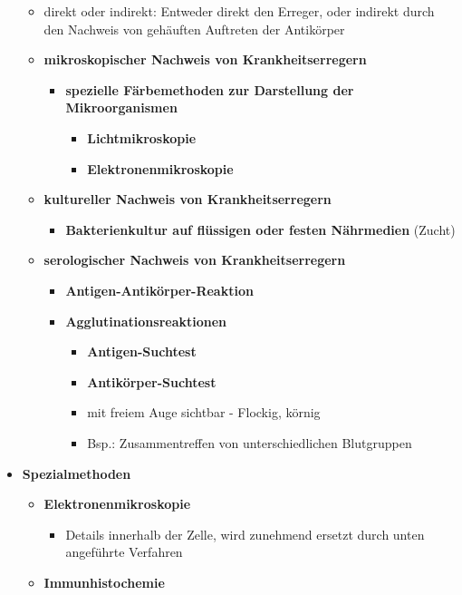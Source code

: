 \begin{itemize}
\begin{itemize}
				\item direkt oder indirekt: Entweder direkt den Erreger, oder indirekt durch den Nachweis von gehäuften Auftreten der Antikörper
				\item \textbf{mikroskopischer Nachweis von Krankheitserregern}
					\begin{itemize}
						\item \textbf{spezielle Färbemethoden zur Darstellung der Mikroorganismen}
							\begin{itemize}
								\item \textbf{Lichtmikroskopie}
								\item \textbf{Elektronenmikroskopie}
							\end{itemize}
					\end{itemize}
				\item \textbf{kultureller Nachweis von Krankheitserregern}
					\begin{itemize}
						\item \textbf{Bakterienkultur auf flüssigen oder festen Nährmedien} (Zucht)
					\end{itemize}
				\item \textbf{serologischer Nachweis von Krankheitserregern}
					\begin{itemize}
						\item \textbf{Antigen-Antikörper-Reaktion}
						\item \textbf{Agglutinationsreaktionen}
							\begin{itemize}
								\item \textbf{Antigen-Suchtest}
								\item \textbf{Antikörper-Suchtest}
								\item mit freiem Auge sichtbar - Flockig, körnig
								\item Bsp.: Zusammentreffen von unterschiedlichen Blutgruppen
							\end{itemize}
					\end{itemize}
			\end{itemize}
		\item \textbf{Spezialmethoden}
			\begin{itemize}
				\item \textbf{Elektronenmikroskopie}
					\begin{itemize}
						\item Details innerhalb der Zelle, wird zunehmend ersetzt durch unten angeführte Verfahren
					\end{itemize}
				\item \textbf{Immunhistochemie}

\end{itemize}
\end{itemize}
